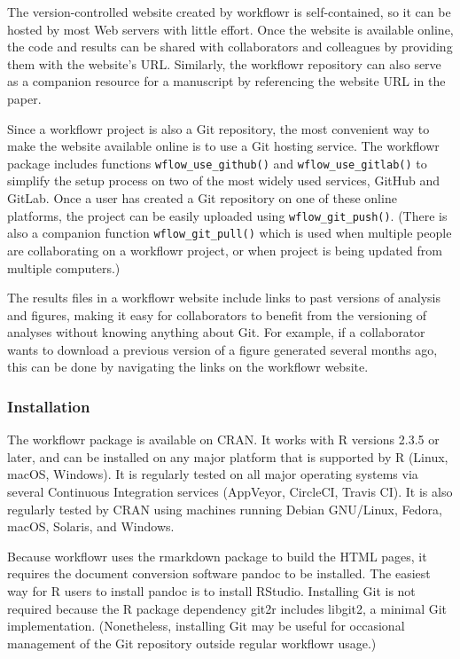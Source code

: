 \documentclass[9pt,a4paper]{extarticle}
\begin{document}
The version-controlled website created by workflowr is self-contained,
so it can be hosted by most Web servers with little effort. Once the
website is available online, the code and results can be shared with
collaborators and colleagues by providing them with the website's URL.
Similarly, the workflowr repository can also serve as a companion
resource for a manuscript by referencing the website URL in the paper.

Since a workflowr project is also a Git repository, the most convenient
way to make the website available online is to use a Git hosting
service. The workflowr package includes functions \texttt{wflow\_use\_github()} and
\texttt{wflow\_use\_gitlab()} to simplify the setup process on two of the most
widely used services, GitHub and GitLab. Once a user has created a Git
repository on one of these online platforms, the project can be easily
uploaded using \texttt{wflow\_git\_push()}. (There is also a companion function
\texttt{wflow\_git\_pull()} which is used when multiple people are collaborating on
a workflowr project, or when project is being updated from multiple
computers.)

The results files in a workflowr website include links to past versions
of analysis and figures, making it easy for collaborators to benefit
from the versioning of analyses without knowing anything about Git. For
example, if a collaborator wants to download a previous version of a
figure generated several months ago, this can be done by navigating the
links on the workflowr website.

\subsubsection*{Installation}

The workflowr package is available on CRAN. It works with R versions
2.3.5 or later, and can be installed on any major platform that is
supported by R (Linux, macOS, Windows). It is regularly tested on all
major operating systems via several Continuous Integration services
(AppVeyor, CircleCI, Travis CI). It is also regularly tested by CRAN
using machines running Debian GNU/Linux, Fedora, macOS, Solaris, and
Windows.

Because workflowr uses the rmarkdown package to build the HTML pages, it
requires the document conversion software pandoc to be installed. The
easiest way for R users to install pandoc is to install RStudio.
Installing Git is not required because the R package dependency git2r
includes libgit2, a minimal Git implementation. (Nonetheless, installing
Git may be useful for occasional management of the Git repository
outside regular workflowr usage.)
\end{document}
